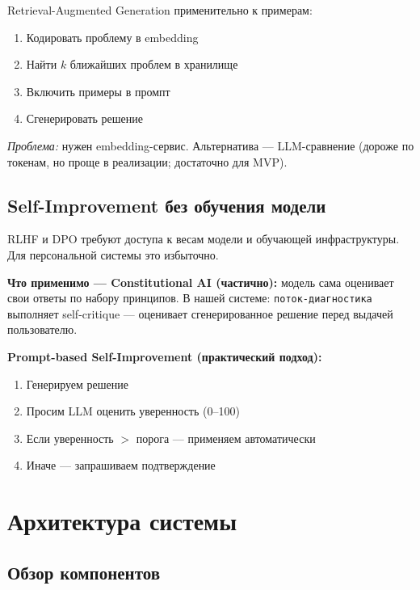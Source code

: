 \documentclass[12pt, a4paper, twoside]{article}
\begin{document}
Retrieval-Augmented Generation применительно к примерам:
\begin{enumerate}[leftmargin=1.5em]
  \item Кодировать проблему в embedding
  \item Найти $k$ ближайших проблем в хранилище
  \item Включить примеры в промпт
  \item Сгенерировать решение
\end{enumerate}

\textit{Проблема:} нужен embedding-сервис. Альтернатива --- LLM-сравнение
(дороже по токенам, но проще в реализации; достаточно для MVP).

\subsection{Self-Improvement без обучения модели}

\begin{warningbox}[title={Что НЕ применимо}]
RLHF и DPO требуют доступа к весам модели и обучающей инфраструктуры.
Для персональной системы это избыточно.
\end{warningbox}

\textbf{Что применимо --- Constitutional AI (частично):}
модель сама оценивает свои ответы по набору принципов.
В нашей системе: \texttt{поток-диагностика} выполняет self-critique ---
оценивает сгенерированное решение перед выдачей пользователю.

\textbf{Prompt-based Self-Improvement (практический подход):}
\begin{enumerate}[leftmargin=1.5em]
  \item Генерируем решение
  \item Просим LLM оценить уверенность (0--100)
  \item Если уверенность $>$ порога --- применяем автоматически
  \item Иначе --- запрашиваем подтверждение
\end{enumerate}

\section{Архитектура системы}

\subsection{Обзор компонентов}
\end{document}
